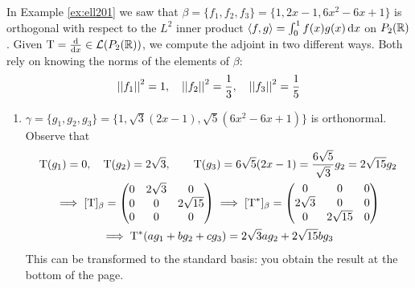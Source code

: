 \begin{example}{}{}
In Example \ref{ex:ell201} we saw that $\beta=\{f_1,f_2,f_3\}=\{1,2x-1,6x^2-6x+1\}$ is orthogonal with respect to the $L^2$ inner product $\left\langle f,g\right\rangle=\int_0^1f(x)g(x)\,{\mathrm{d} x}$ on $P_2(\mathbb{R})$. Given $\mathrm{T}=\frac{\mathrm{d} }{\mathrm{d} x}\in\mathcal{L}(P_2(\mathbb{R}))$, we compute the adjoint in two different ways. Both rely on knowing the norms of the elements of $\beta$:
\[\left| \left| f_1\right|\right|^2=1,\quad \left| \left| f_2\right|\right|^2=\frac 13,\quad\left| \left| f_3\right|\right|^2=\frac 1{5}\]
\begin{enumerate}
  \item $\gamma=\{g_1,g_2,g_3\}=\{1,\sqrt{3}(2x-1),\sqrt{5}(6x^2-6x+1)\}$ is orthonormal. Observe that
  \begin{gather*}
  \mathrm{T}(g_1)=0,\quad \mathrm{T}(g_2)=2\sqrt 3,\qquad \mathrm{T}(g_3)=6\sqrt 5(2x-1)=\frac{6\sqrt 5}{\sqrt 3}g_2=2\sqrt{15}g_2\\
  \implies [\mathrm{T}]_\beta=\begin{pmatrix}
  0&2\sqrt 3&0\\
  0&0&2\sqrt{15}\\
  0&0&0
  \end{pmatrix} \implies
  [\mathrm{T}^*]_\beta=\begin{pmatrix}
  0&0&0\\
  2\sqrt 3&0&0\\
  0&2\sqrt{15}&0
  \end{pmatrix}\\
  \implies \mathrm{T}^*(ag_1+bg_2+cg_3)=2\sqrt 3ag_2+2\sqrt{15}bg_3
  \end{gather*}
  This can be transformed to the standard basis: you obtain the result at the bottom of the page.
  

\end{enumerate}
\end{example}
